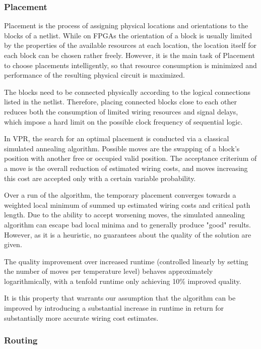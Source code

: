 \subsubsection{Placement}

Placement is the process of assigning physical locations and orientations to the blocks of a netlist. While on \glspl{FPGA} the orientation of a block is usually limited by the properties of the available resources at each location, the location itself for each block can be chosen rather freely. However, it is the main task of Placement to choose placements intelligently, so that resource consumption is minimized and performance of the resulting physical circuit is maximized.

The blocks need to be connected physically according to the logical connections listed in the netlist. Therefore, placing connected blocks close to each other reduces both the consumption of limited wiring resources and signal delays, which impose a hard limit on the possible clock frequency of sequential logic.

In \gls{VPR}, the search for an optimal placement is conducted via a classical simulated annealing algorithm. Possible moves are the swapping of a block's position with another free or occupied valid position. The acceptance criterium of a move is the overall reduction of estimated wiring costs, and moves increasing this cost are accepted only with a certain variable probability.

Over a run of the algorithm, the temporary placement converges towards a weighted local minimum of summed up estimated wiring costs and critical path length. Due to the ability to accept worsening moves, the simulated annealing algorithm can escape bad local minima and to generally produce "good" results. However, as it is a heuristic, no guarantees about the quality of the solution are given.

The quality improvement over increased runtime (controlled linearly by setting the number of moves per temperature level) behaves approximately logarithmically, with a tenfold runtime only achieving 10\% improved quality\cite{vtr8}.

It is this property that warrants our assumption that the algorithm can be improved by introducing a substantial increase in runtime in return for substantially more accurate wiring cost estimates.

\subsubsection{Routing}

